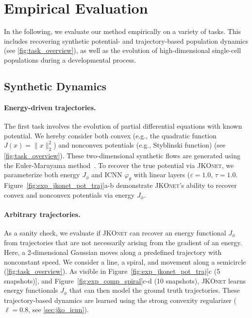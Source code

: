 \section{Empirical Evaluation} \label{sec:jkonet_evaluation}
In the following, we evaluate our method empirically on a variety of tasks. This includes recovering synthetic potential- and trajectory-based population dynamics (see \cref{fig:task_overview}), as well as the evolution of high-dimensional single-cell populations during a developmental process. 

\subsection{Synthetic Dynamics}
\label{sec:jkonet_synthetic}

\paragraph{Energy-driven trajectories.} The first task involves the evolution of partial differential equations with known potential. We hereby consider both convex (e.g., the quadratic function $J(x) = \|x\|^2_2$) and nonconvex potentials (e.g., Styblinski function) (see \cref{fig:task_overview}). These two-dimensional synthetic flows are generated using the Euler-Maruyama method~\citep{kloeden1992stochastic}. 
To recover the true potential via \textsc{JKOnet}, we parameterize both energy $J_\phi$ and \acrshort{ICNN} $\varphi_\theta$ with linear layers ($\varepsilon = 1.0$, $\tau = 1.0$.
Figure~\ref{fig:exp_jkonet_pot_traj}a-b demonstrate \textsc{JKOnet}'s ability to recover convex and nonconvex potentials via energy $J_\phi$.

\paragraph{Arbitrary trajectories.}
As a sanity check, we evaluate if \textsc{JKOnet} can recover an energy functional $J_\phi$ from trajectories that are not necessarily arising from the gradient of an energy. Here, a 2-dimensional Gaussian moves along a predefined trajectory with nonconstant speed. 
We consider a line, a spiral, and movement along a semicircle (\cref{fig:task_overview}). As visible in Figure~\ref{fig:exp_jkonet_pot_traj}c (5 snapshots)], and Figure~\ref{fig:exp_comp_spiral}c-d (10 snapshots), \textsc{JKOnet} learns energy functionals $J_\phi$ that can then model the ground truth trajectories.
These trajectory-based dynamics are learned using the strong convexity regularizer ($\ell=0.8$, see \cref{sec:jko_icnn}).


